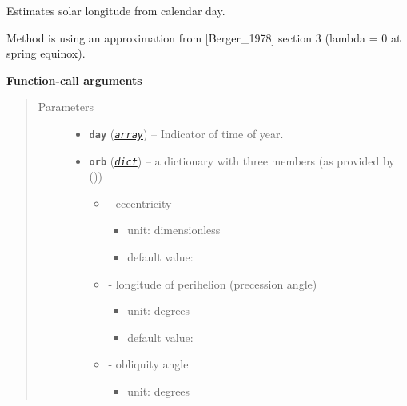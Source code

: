 \documentclass[a4paper,10pt,english]{sphinxmanual}
\begin{document}
\begin{fulllineitems}
\label{api/climlab.solar:climlab.solar.insolation.solar_longitude}
Estimates solar longitude from calendar day.

Method is using an approximation from {[}Berger\_1978{]} section 3
(lambda = 0 at spring equinox).

\textbf{Function-call arguments}
\begin{quote}\begin{description}
\item[{Parameters}] \leavevmode\begin{itemize}
\item {} 
\textbf{\texttt{day}} (\href{http://docs.python.org/2.7/library/array.html\#module-array}{\emph{\texttt{array}}}) -- Indicator of time of year.

\item {} 
\textbf{\texttt{orb}} (\href{http://docs.python.org/2.7/library/stdtypes.html\#dict}{\emph{\texttt{dict}}}) -- 
a dictionary with three members (as provided by 
{\hyperref[api/climlab.solar:climlab.solar.orbital.OrbitalTable]{\emph{}}} ())
\begin{itemize}
\item {} 
 - eccentricity
\begin{itemize}
\item {} 
unit: dimensionless

\item {} 
default value: 

\end{itemize}

\item {} 
 - longitude of perihelion 
(precession angle)
\begin{itemize}
\item {} 
unit: degrees

\item {} 
default value: 

\end{itemize}

\item {} 
 - obliquity angle
\begin{itemize}
\item {} 
unit: degrees


\end{itemize}
\end{itemize}
\end{itemize}
\end{description}
\end{quote}
\end{fulllineitems}
\end{document}
